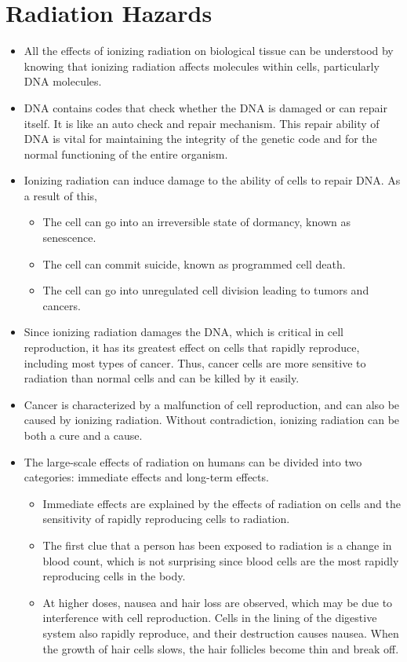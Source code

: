 \documentclass[12pt]{book}
\begin{document}
\chapter{Radiation Hazards}
\begin{itemize}
    \item All the effects of ionizing radiation on biological tissue can be understood by knowing that ionizing radiation affects molecules within cells, particularly DNA molecules.

    \item DNA contains codes that check whether the DNA is damaged or can repair itself. It is like an auto check and repair mechanism. This repair ability of DNA is vital for maintaining the integrity of the genetic code and for the normal functioning of the entire organism.
    \item Ionizing radiation can induce damage to the ability of cells to repair DNA. As a result of this,

	\begin{itemize}
\item The cell can go into an irreversible state of dormancy, known as senescence.
\item The cell can commit suicide, known as programmed cell death.
\item The cell can go into unregulated cell division leading to tumors and cancers.

\end{itemize}

\item Since ionizing radiation damages the DNA, which is critical in cell reproduction, it has its greatest effect on cells that rapidly reproduce, including most types of cancer. Thus, cancer cells are more sensitive to radiation than normal cells and can be killed by it easily.
\item Cancer is characterized by a malfunction of cell reproduction, and can also be caused by ionizing radiation. Without contradiction, ionizing radiation can be both a cure and a cause.

\item The large-scale effects of radiation on humans can be divided into two categories: immediate effects and long-term effects.
    \begin{itemize}
 \item
Immediate effects are explained by the effects of radiation on cells and the sensitivity of rapidly reproducing cells to radiation.
\item The first clue that a person has been exposed to radiation is a change in blood count, which is not surprising since blood cells are the most rapidly reproducing cells in the body.
\item At higher doses, nausea and hair loss are observed, which may be due to interference with cell reproduction. Cells in the lining of the digestive system also rapidly reproduce, and their destruction causes nausea.
When the growth of hair cells slows, the hair follicles become thin and break off.


\end{itemize}
\end{itemize}
\end{document}
